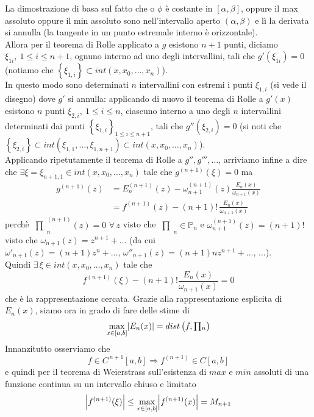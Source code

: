 \documentclass[12pt]{article}
\DeclarePairedDelimiter{\abs}{\lvert}{\rvert}
\newcommand{\inter}{\begin{matrix}\prod\end{matrix}}
\begin{document}
La dimostrazione di basa sul fatto che o $\phi$ è costante in $[\alpha,\beta]$, oppure il max assoluto oppure il min assoluto sono nell'intervallo aperto $(\alpha,\beta)$ e lì la derivata si annulla (la tangente in un punto estremale interno è orizzontale). \\
Allora per il teorema di Rolle applicato a $g$ esistono $n+1$ punti, diciamo $\xi_{1i}, \ 1 \leq i \leq n+1$, ognuno interno ad uno degli intervallini, tali che $g'(\xi_{1i})=0$ (notiamo che $\left\{ \xi_{1,i} \right\} \subset int(x,x_0,\dots,x_n)$). \\
In questo modo sono determinati $n$ intervallini con estremi i punti $\xi_{1,i}$ (si vede il disegno) dove $g'$ si annulla: applicando di nuovo il teorema di Rolle a $g'(x)$ esistono $n$ punti $\xi_{2,i}, \ 1 \leq i \leq n$, ciascuno interno a uno degli $n$ intervallini determinati dai punti $\left\{ \xi_{1,i} \right\}_{1 \leq i \leq n+1}$, tali che $g''(\xi_{2,i}) = 0$ (si noti che $\left\{ \xi_{2,i} \right\} \subset int(\xi_{1,1},\dots, \xi_{1,n+1}) \subset int(x,x_0,\dots,x_n)$). \\
Applicando ripetutamente il teorema di Rolle a $g'',g''',\dotso$, arriviamo infine a dire che $\exists \xi = \xi_{n+1,1} \in int(x,x_0,\dots,x_n)$ tale che $g^{(n+1)}(\xi) = 0$ ma
\[\begin{split}
    g^{(n+1)}(z) & = E_n^{(n+1)}(z) - \omega_{n+1}^{(n+1)}(z) \frac{E_n(x)}{\omega_{n+1}(x)} \\
    & = f^{(n+1)}(z) - (n+1)!\, \frac{E_n(x)}{\omega_{n+1}(x)}
\end{split}\]
perchè $\inter_n^{(n+1)}(z) = 0 \,\,\forall\,z$ visto che $\inter_n \in \mathbb{P}_n$ e $\omega_{n+1}^{(n+1)}(z) = (n+1)!$ visto che $\omega_{n+1}(z) = z^{n+1} + \dotso$ (da cui $\omega'_{n+1}(z) = (n+1)z^n + \dotso,\, \omega''_{n+1}(z) = (n+1)nz^{n+1} + \dotso,\,\dotso$).\\
Quindi $\exists \, \xi \in int(x,x_0,\dotso,x_n)$ tale che
\[f^{(n+1)}(\xi) - (n+1)!\frac{E_n(x)}{\omega_{n+1}(x)} = 0\]
che è la rappresentazione cercata.
\newline
Grazie alla rappresentazione esplicita di $E_n(x)$, siamo ora in grado di fare delle stime di
\[\max_{x \in [a,b]} \abs{E_n(x)} = dist\left(f, \inter_n\right)\]
Innanzitutto osserviamo che
\[f \in C^{\,n+1}[a,b] \Longrightarrow f^{(n+1)} \in C[a,b]\]
e quindi per il teorema di Weierstrass sull'esistenza di $max$ e $min$ assoluti di una funzione continua su un intervallo chiuso e limitato
\[\abs*{f^{(n+1)}(\xi)} \le \max_{x \in [a,b]} \abs*{f^{(n+1)}(x)} = M_{n+1}\]
\end{document}
